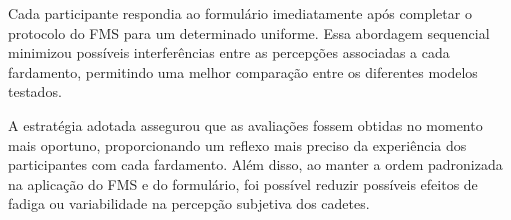\tab Cada participante respondia ao formulário imediatamente após completar o protocolo do \acrshort{FMS} para um determinado uniforme. Essa abordagem sequencial minimizou possíveis interferências entre as percepções associadas a cada fardamento, permitindo uma melhor comparação entre os diferentes modelos testados.

A estratégia adotada assegurou que as avaliações fossem obtidas no momento mais oportuno, proporcionando um reflexo mais preciso da experiência dos participantes com cada fardamento. Além disso, ao manter a ordem padronizada na aplicação do \acrshort{FMS} e do formulário, foi possível reduzir possíveis efeitos de fadiga ou variabilidade na percepção subjetiva dos cadetes.